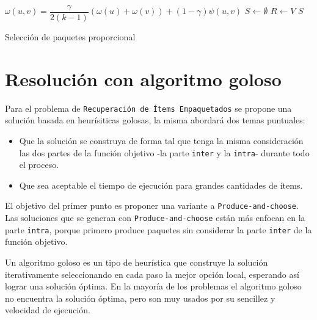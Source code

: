 \begin{center}
	\begin{algorithm}[H]
	\DontPrintSemicolon
	\SetAlgoLined
		$\omega(u,v) = \dfrac{\gamma}{2( k - 1)} (\omega(u) + \omega(v)) + (1 - \gamma)\psi(u,v)$\;
		$S \leftarrow \emptyset$\;
		$R \leftarrow V$\;
		\Return $S$\;
	\caption{Selección de paquetes proporcional}\label{alg:algSelProp}
	\end{algorithm}
\end{center}

\section{Resolución con algoritmo goloso}

Para el problema de \texttt{Recuperación de Ítems Empaquetados} se propone una solución basada en heurísiticas golosas, la misma abordará dos temas puntuales:
\begin{itemize}
	\item Que la solución se construya de forma tal que tenga la misma consideración las dos partes de la función objetivo -la parte \texttt{inter} y la \texttt{intra}- durante todo el proceso.
	\item Que sea aceptable el tiempo de ejecución para grandes cantidades de ítems.
\end{itemize}

El objetivo del primer punto es proponer una variante a \texttt{Produce-and-choose}. Las soluciones que se generan con \texttt{Produce-and-choose} están más enfocan en la parte \texttt{intra}, porque primero produce paquetes sin considerar la parte \texttt{inter} de la función objetivo.

Un algoritmo goloso es un tipo de heurística que construye la solución iterativamente seleccionando en cada paso la mejor opción local, esperando así lograr una solución óptima. En la mayoría de los problemas el algoritmo goloso no encuentra la solución óptima, pero son muy usados por su sencillez y velocidad de ejecución.

